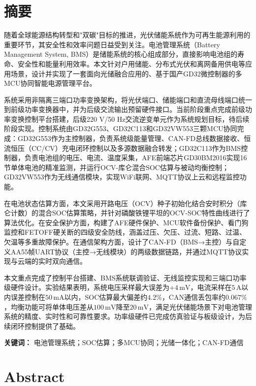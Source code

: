 \clearpage
\section*{摘要}

随着全球能源结构转型和"双碳"目标的推进，光伏储能系统作为可再生能源利用的重要环节，其安全性和效率问题日益受到关注。电池管理系统（Battery Management System, BMS）是储能系统的核心组成部分，直接影响电池组的寿命、安全性和能量利用效率。本文针对户用储能、分布式光伏和离网备用供电等应用场景，设计并实现了一套面向光储融合应用的、基于国产GD32微控制器的多MCU协同智能电源管理平台。

系统采用非隔离三端口功率变换架构，将光伏端口、储能端口和直流母线端口统一到前级功率变换器中，并为后级交流输出预留硬件接口。当前阶段重点完成前级功率变换控制平台搭建，后级220 V/50 Hz交流逆变单元作为系统规划目标，待后续阶段实现。控制系统由GD32G553、GD32C113和GD32VW553三颗MCU协同完成：GD32G553作为主控制器，负责系统级能量管理、CAN-FD总线数据接收、恒流恒压（CC/CV）充电闭环控制以及多源数据融合转发；GD32C113作为BMS控制器，负责电池组的电压、电流、温度采集，AFE前端芯片GD30BM2016实现16节单体电池的精准监测，并运行OCV-库仑混合SOC估算与被动均衡控制；GD32VW553作为无线通信模块，实现WiFi联网、MQTT协议上云和远程监控功能。

在电池状态估算方面，本文采用开路电压（OCV）种子初始化结合安时积分（库仑计数）的混合SOC估算策略，并针对磷酸铁锂平坦的OCV-SOC特性曲线进行了算法优化。在安全保护方面，构建了AFE硬件保护、MCU软件备份保护、看门狗监控和FETOFF硬关断的四级安全防线，涵盖过压、欠压、过流、短路、过温、欠温等多重故障保护。在通信架构方面，设计了CAN-FD（BMS→主控）与自定义AA55帧UART协议（主控→无线模块）的两级数据链路，并通过MQTT协议实现与云端的实时双向通信。

本文重点完成了控制平台搭建、BMS系统联调验证、无线监控实现和三端口功率级硬件设计。实验结果表明，系统电压采样最大误差为$+4\,\mathrm{mV}$，电流采样在$5\,\mathrm{A}$以内误差控制在$50\,\mathrm{mA}$以内，SOC估算最大偏差约$4.2\%$，CAN通信丢包率约$0.067\%$，均衡功能可将单体电压差从$100\,\mathrm{mV}$降至$20\,\mathrm{mV}$，满足光伏储能场景下对电池管理系统的精度、实时性和可靠性要求。功率级硬件已完成仿真验证与板级设计，为后续闭环控制提供了基础。

\vspace{1em}
\noindent\textbf{关键词：} 电池管理系统；SOC估算；多MCU协同；光储一体化；CAN-FD通信

\clearpage
\section*{Abstract}

